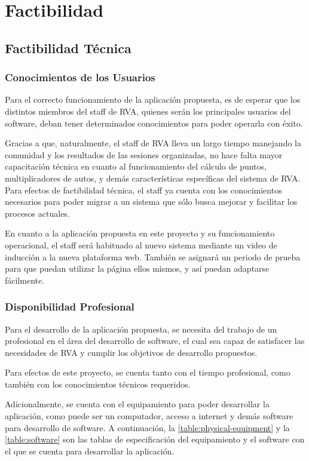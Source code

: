 \chapter{Factibilidad}

\section{Factibilidad Técnica}
\subsection{Conocimientos de los Usuarios}
Para el correcto funcionamiento de la aplicación propuesta, es de esperar que los distintos miembros del staff de RVA, quienes serán los principales usuarios del software, deban tener determinados conocimientos para poder operarla con éxito.

Gracias a que, naturalmente, el staff de RVA lleva un largo tiempo manejando la comunidad y los resultados de las sesiones organizadas, no hace falta mayor capacitación técnica en cuanto al funcionamiento del cálculo de puntos, multiplicadores de autos, y demás características específicas del sistema de RVA. Para efectos de factibilidad técnica, el staff ya cuenta con los conocimientos necesarios para poder migrar a un sistema que sólo busca mejorar y facilitar los procesos actuales.

En cuanto a la aplicación propuesta en este proyecto y su funcionamiento operacional, el staff será habituado al nuevo sistema mediante un video de inducción a la nueva plataforma web. También se asignará un periodo de prueba para que puedan utilizar la página ellos mismos, y así puedan adaptarse fácilmente.

\subsection{Disponibilidad Profesional}
Para el desarrollo de la aplicación propuesta, se necesita del trabajo de un profesional en el área del desarrollo de software, el cual sea capaz de satisfacer las necesidades de RVA y cumplir los objetivos de desarrollo propuestos.

Para efectos de este proyecto, se cuenta tanto con el tiempo profesional, como también con los conocimientos técnicos requeridos.

Adicionalmente, se cuenta con el equipamiento para poder desarrollar la aplicación, como puede ser un computador, acceso a internet y demás software para desarrollo de software. A continuación, la \autoref{table:physical-equipment} y la \autoref{table:software} son las tablas de especificación del equipamiento y el software con el que se cuenta para desarrollar la aplicación.


